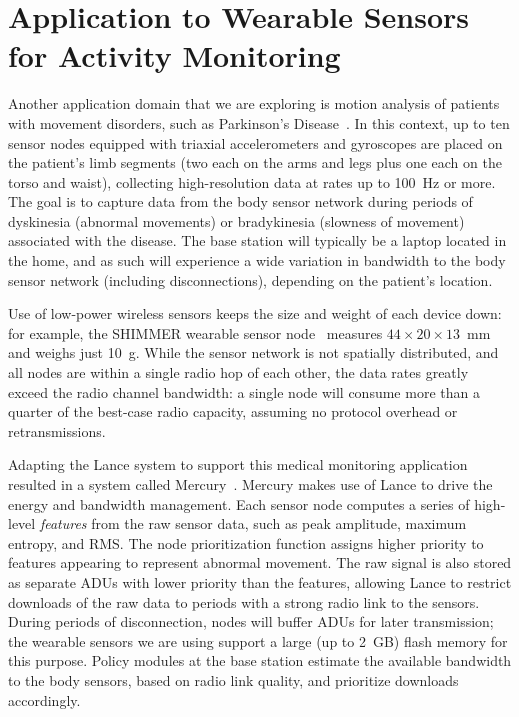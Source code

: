 \section{Application to Wearable Sensors for Activity Monitoring}
\label{lance-sec-mercury}

Another application domain that we are exploring is motion analysis of
patients with movement disorders, such as Parkinson's
Disease~\cite{parkinsons-embs07}. In this context, up to ten sensor nodes
equipped with triaxial accelerometers and gyroscopes are placed on the
patient's limb segments (two each on the arms and legs plus one each on the
torso and waist), collecting high-resolution data at rates up to 100~Hz or
more. The goal is to capture data from the body sensor network during periods
of dyskinesia (abnormal movements) or bradykinesia (slowness of movement)
associated with the disease. The base station will typically be a laptop
located in the home, and as such will experience a wide variation in
bandwidth to the body sensor network (including disconnections), depending on
the patient's location.

Use of low-power wireless sensors keeps the size and weight of each device
down: for example, the SHIMMER wearable sensor node~\cite{parkinsons-embs07}
measures $44 \times 20 \times 13$~mm and weighs just 10~g. While the sensor
network is not spatially distributed, and all nodes are within a single radio
hop of each other, the data rates greatly exceed the radio channel bandwidth:
a single node will consume more than a quarter of the best-case radio
capacity, assuming no protocol overhead or retransmissions.

Adapting the Lance system to support this medical monitoring application
resulted in a system called Mercury~\cite{mercury-sensys09}. Mercury makes
use of Lance to drive the energy and bandwidth management. Each sensor node
computes a series of high-level \textit{features} from the raw sensor data,
such as peak amplitude, maximum entropy, and RMS. The node prioritization
function assigns higher priority to features appearing to represent abnormal
movement. The raw signal is also stored as separate ADUs with lower priority
than the features, allowing Lance to restrict downloads of the raw data to
periods with a strong radio link to the sensors. During periods of
disconnection, nodes will buffer ADUs for later transmission; the wearable
sensors we are using support a large (up to 2~GB) flash memory for this
purpose. Policy modules at the base station estimate the available bandwidth
to the body sensors, based on radio link quality, and prioritize downloads
accordingly.

